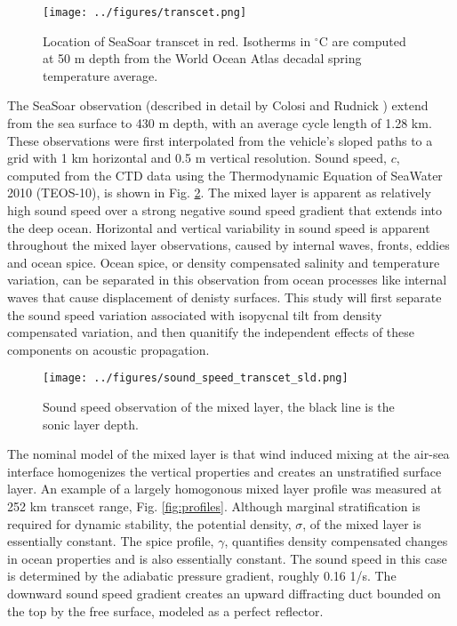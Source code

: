 \documentclass[preprint,NumberedRefs]{JASA}
\begin{document}
\begin{figure}
\texttt{[image: ../figures/transcet.png]}
    \caption{\label{fig:transcet}{Location of SeaSoar transcet in red. Isotherms in $^\circ$C are computed at 50 m depth from the World Ocean Atlas decadal spring temperature average.}}
\end{figure}

The SeaSoar observation (described in detail by Colosi and Rudnick \citep{colosi2020observations}) extend from the sea surface to 430 m depth, with an average cycle length of 1.28 km. These observations were first interpolated from the vehicle's sloped paths to a grid with 1 km horizontal and 0.5 m vertical resolution. Sound speed, $c$, computed from the CTD data using the Thermodynamic Equation of SeaWater 2010 (TEOS-10), is shown in Fig. \ref{fig:c_grid}. The mixed layer is apparent as relatively high sound speed over a strong negative sound speed gradient that extends into the deep ocean. Horizontal and vertical variability in sound speed is apparent throughout the mixed layer observations, caused by internal waves, fronts, eddies and ocean spice\citep{colosi2020observations}. Ocean spice, or density compensated salinity and temperature variation, can be separated in this observation from ocean processes like internal waves that cause displacement of denisty surfaces\citep{dzieciuch2004}. This study will first separate the sound speed variation associated with isopycnal tilt from density compensated variation, and then quanitify the independent effects of these components on acoustic propagation.

\begin{figure}
\texttt{[image: ../figures/sound\_speed\_transcet\_sld.png]}
\caption{\label{fig:c_grid}{Sound speed observation of the mixed layer, the black line is the sonic layer depth.}}
\end{figure}

The nominal model of the mixed layer is that wind induced mixing at the air-sea interface homogenizes the vertical properties and creates an unstratified surface layer. An example of a largely homogonous mixed layer profile was measured at 252 km transcet range, Fig. \ref{fig:profiles}. Although marginal stratification is required for dynamic stability, the potential density, $\sigma$, of the mixed layer is essentially constant. The spice profile, $\gamma$, quantifies density compensated changes in ocean properties and is also essentially constant. The sound speed in this case is determined by the adiabatic pressure gradient, roughly 0.16 1/s. The downward sound speed gradient creates an upward diffracting duct bounded on the top by the free surface, modeled as a perfect reflector.
\end{document}
